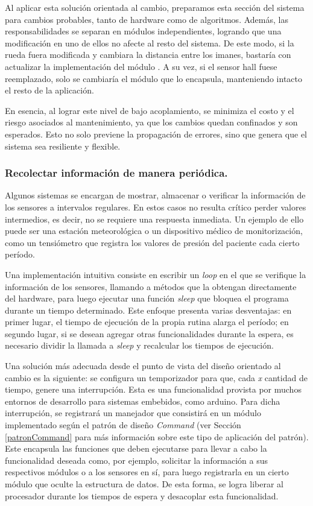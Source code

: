 Al aplicar esta solución orientada al cambio, preparamos esta sección del sistema para cambios probables, tanto de hardware como de algoritmos. Además, las responsabilidades se separan en módulos independientes, logrando que una modificación en uno de ellos no afecte al resto del sistema. De este modo, si la rueda fuera modificada y cambiara la distancia entre los imanes, bastaría con actualizar la implementación del módulo \SensorVelocidad. A su vez, si el sensor \gls{hall} fuese reemplazado, solo se cambiaría el módulo que lo encapsula, manteniendo intacto el resto de la aplicación.

En esencia, al lograr este nivel de bajo acoplamiento, se minimiza el costo y el riesgo asociados al mantenimiento, ya que los cambios quedan confinados y son esperados. Esto no solo previene la propagación de errores, sino que genera que el sistema sea resiliente y flexible.


\subsubsection*{Recolectar información de manera periódica.}

Algunos sistemas se encargan de mostrar, almacenar o verificar la información de los sensores a intervalos regulares. En estos casos no resulta crítico perder valores intermedios, es decir, no se requiere una respuesta inmediata. Un ejemplo de ello puede ser una estación meteorológica o un dispositivo médico de monitorización, como un tensiómetro que registra los valores de presión del paciente cada cierto período.

Una implementación intuitiva consiste en escribir un \textit{loop} en el que se verifique la información de los sensores, llamando a métodos que la obtengan directamente del hardware, para luego ejecutar una función \textit{sleep} que bloquea el programa durante un tiempo determinado. Este enfoque presenta varias desventajas: en primer lugar, el tiempo de ejecución de la propia rutina alarga el período; en segundo lugar, si se desean agregar otras funcionalidades durante la espera, es necesario dividir la llamada a \textit{sleep} y recalcular los tiempos de ejecución.

Una solución más adecuada desde el punto de vista del diseño orientado al cambio es la siguiente: se configura un temporizador para que, cada \textit{x} cantidad de tiempo, genere una interrupción. Esta es una funcionalidad provista por muchos entornos de desarrollo para sistemas embebidos, como \gls{arduino}.
Para dicha interrupción, se registrará un manejador que consistirá en un módulo implementado según el patrón de diseño \textit{Command} (ver Sección \ref{patronCommand} para más información sobre este tipo de aplicación del patrón). Este encapsula las funciones que deben ejecutarse para llevar a cabo la funcionalidad deseada como, por ejemplo, solicitar la información a sus respectivos módulos \Computador o a los sensores en sí, para luego registrarla en un cierto módulo que oculte la estructura de datos. De esta forma, se logra liberar al procesador durante los tiempos de espera y desacoplar esta funcionalidad.


